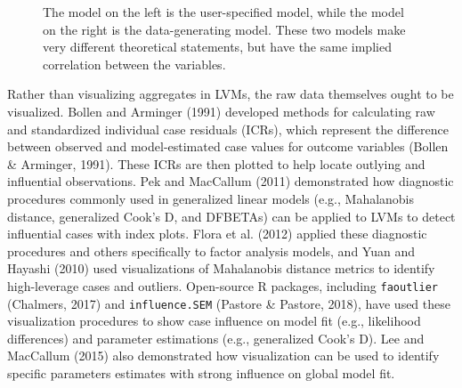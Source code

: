 \documentclass[
  english,
  doc]{apa6}
\begin{document}
\begin{figure}
\begin{center}
\caption{The model on the left is the user-specified model, while the model on the right is the data-generating model. These two models make very different theoretical statements, but have the same implied correlation between the variables.}
\label{fig:implied}
\end{center}
\end{figure}

Rather than visualizing aggregates in LVMs, the raw data themselves ought to be visualized. Bollen and Arminger (1991) developed methods for calculating raw and standardized individual case residuals (ICRs), which represent the difference between observed and model-estimated case values for outcome variables (Bollen \& Arminger, 1991). These ICRs are then plotted to help locate outlying and influential observations. Pek and MacCallum (2011) demonstrated how diagnostic procedures commonly used in generalized linear models (e.g., Mahalanobis distance, generalized Cook's D, and DFBETAs) can be applied to LVMs to detect influential cases with index plots. Flora et al. (2012) applied these diagnostic procedures and others specifically to factor analysis models, and Yuan and Hayashi (2010) used visualizations of Mahalanobis distance metrics to identify high-leverage cases and outliers. Open-source R packages, including \texttt{faoutlier} (Chalmers, 2017) and \texttt{influence.SEM} (Pastore \& Pastore, 2018), have used these visualization procedures to show case influence on model fit (e.g., likelihood differences) and parameter estimations (e.g., generalized Cook's D). Lee and MacCallum (2015) also demonstrated how visualization can be used to identify specific parameters estimates with strong influence on global model fit.
\end{document}
